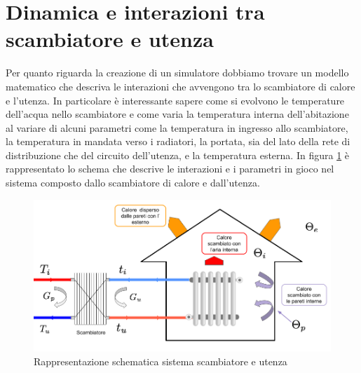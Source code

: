 \documentclass[laurea,oneside,11pt]{USiena_tesiLM}
\begin{document}
\section{Dinamica e interazioni tra scambiatore e utenza}
Per quanto riguarda la creazione di un simulatore dobbiamo trovare un modello matematico che descriva le interazioni che avvengono tra lo scambiatore di calore e l'utenza. In particolare è interessante sapere come si evolvono le temperature dell'acqua nello scambiatore e come varia la temperatura interna dell'abitazione al variare di alcuni parametri come la temperatura in ingresso allo scambiatore, la temperatura in mandata verso i radiatori, la portata, sia del lato della rete di distribuzione che del circuito dell'utenza, e la temperatura esterna.
In figura \ref{fig:scamb_utenza} è rappresentato lo schema che descrive le interazioni e i parametri in gioco nel sistema composto dallo scambiatore di calore e dall'utenza. 

\begin{figure}[h]
\begin{center}
\includegraphics[width=\textwidth]{figure/scamb_utenza} %
\caption{Rappresentazione schematica sistema scambiatore e utenza}
\label{fig:scamb_utenza}
\end{center}
\end{figure}
\end{document}
